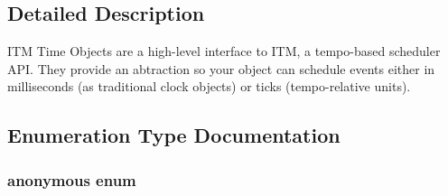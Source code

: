 \subsection{Detailed Description}
ITM Time Objects are a high-\/level interface to ITM, a tempo-\/based scheduler API. They provide an abtraction so your object can schedule events either in milliseconds (as traditional clock objects) or ticks (tempo-\/relative units). 

\subsection{Enumeration Type Documentation}
\hypertarget{group__time_ga99fb83031ce9923c84392b4e92f956b5}{
\subsubsection[{"@2}]{\setlength{\rightskip}{0pt plus 5cm}anonymous enum}}
\label{group__time_ga99fb83031ce9923c84392b4e92f956b5}


